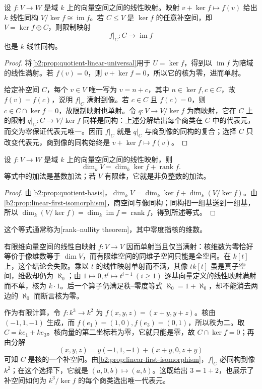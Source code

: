 \begin{proposition}[线性映射第一同构定理]\label{b2:prop:linear-first-isomorphism}
	设 \(f:V\to W\) 是域 \(k\) 上的向量空间之间的线性映射。映射 \(v+\ker f\mapsto f(v)\) 给出 \(k\) 线性同构 \(V/\ker f\cong\operatorname{im}f\)。若 \(C\le V\) 是 \(\ker f\) 的任意补空间，即 \(V=\ker f\oplus C\)，则限制映射
	\[
		f|_C:C\longrightarrow\operatorname{im}f
	\]
	也是 \(k\) 线性同构。
\end{proposition}
\begin{proof}
	将\cref{b2:prop:quotient-linear-universal}用于 \(U=\ker f\)，得到以 \(\operatorname{im}f\) 为陪域的线性满射。若 \(f(v)=0\)，则 \(v+\ker f=0\)，所以它的核为零，进而单射。

	给定补空间 \(C\)，每个 \(v\in V\) 唯一写为 \(v=n+c\)，其中 \(n\in\ker f,c\in C\)，故 \(f(v)=f(c)\)，说明 \(f|_C\) 满射到像。若 \(c\in C\) 且 \(f(c)=0\)，则 \(c\in C\cap\ker f=0\)，故限制映射也单射。令 \(q:V\to V/\ker f\) 为商映射，它在 \(C\) 上的限制 \(q|_C:C\to V/\ker f\) 同样是同构：上述分解给出每个商类在 \(C\) 中的代表元，而交为零保证代表元唯一。因而 \(f|_C\) 就是 \(q|_C\) 与商到像的同构的复合；选择 \(C\) 只改变代表元，商到像的同构始终是 \(v+\ker f\mapsto f(v)\)。
\end{proof}

\begin{theorem}[秩与核的维数]\label{b2:thm:rank-nullity}
	设 \(f:V\to W\) 是域 \(k\) 上的向量空间之间的线性映射，则
	\[
		\dim_kV=\dim_k\ker f+\operatorname{rank}f.
	\]
	等式中的加法是基数加法；若 \(V\) 有限维，它就是非负整数的加法。
\end{theorem}
\begin{proof}
	由\cref{b2:prop:quotient-basis}，\(\dim_kV=\dim_k\ker f+\dim_k(V/\ker f)\)。由\cref{b2:prop:linear-first-isomorphism}，商空间与像同构；同构把一组基送到一组基，所以 \(\dim_k(V/\ker f)=\dim_k\operatorname{im}f=\operatorname{rank}f\)，得到所述等式。
\end{proof}

这个等式通常称为[rank--nullity theorem]，其中零度指核的维数。

\ProseParagraphBreak
有限维向量空间的线性自映射 \(f:V\to V\) 因而单射当且仅当满射：核维数为零恰好等价于像维数等于 \(\dim V\)，而有限维空间的同维子空间只能是全空间。在 \(k[t]\) 上，这个结论会失败。乘以 \(t\) 的线性映射单射而不满，其像 \(tk[t]\) 虽是真子空间，维数却仍为 \(\aleph_0\)；由 \(1\mapsto0,t^i\mapsto t^{i-1}\ (i\ge1)\) 逐基向量定义的线性映射满射而不单，核为 \(k\cdot1\)。后一个算子仍满足秩--零度等式 \(\aleph_0=1+\aleph_0\)，却不能消去两边的 \(\aleph_0\) 而断言核为零。

\ProseParagraphBreak
作为有限计算，令 \(f:k^3\to k^2\) 为 \(f(x,y,z)=(x+y,y+z)\)。核由 \((-1,1,-1)\) 生成，而 \(f(e_1)=(1,0),f(e_3)=(0,1)\)，所以秩为二。取 \(C=ke_1+ke_3\)。核向量的第二坐标若为零，它就只能是零，故 \(C\cap\ker f=0\)；再由分解
\[
	(x,y,z)=y(-1,1,-1)+(x+y,0,z+y)
\]
可知 \(C\) 是核的一个补空间。由\cref{b2:prop:linear-first-isomorphism}，\(f|_C\) 必同构到像 \(k^2\)；在这个选择下，它就是 \((a,0,b)\mapsto(a,b)\)。这既给出 \(3=1+2\)，也展示了补空间如何为 \(k^3/\ker f\) 的每个商类选出唯一代表元。
